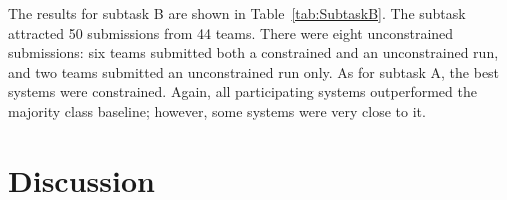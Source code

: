 \documentclass[11pt]{article}
\begin{document}
\begin{table}[t!]
\begin{small}
    \end{small}
    \caption{\label{tab:SubtaskB} \textbf{Results for subtask B.}
             The $^*$ indicates system resubmissions (because they initially trained on Twitter2013-test),
             and the $^\diamond$ indicates a system that includes a task co-organizer as a team member.
             The systems are sorted by their score on the Twitter2014 test dataset;
             the rankings on the individual datasets are indicated with a subscript.
             The last two columns show macro- and micro-averaged results across the three 2014 test datasets.}
  \end{table}


The results for subtask B are shown in Table~\ref{tab:SubtaskB}. The subtask attracted 50 submissions from 44 teams. There were eight unconstrained submissions: six teams submitted both a constrained and an unconstrained run, and two teams submitted an unconstrained run only. As for subtask A, the best systems were constrained. Again, all participating systems outperformed the majority class baseline; however, some systems were very close to it.


\section{Discussion}
\end{document}
